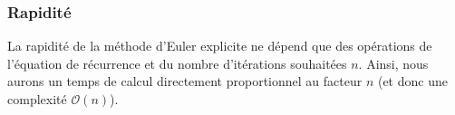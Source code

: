 \documentclass[10pt]{article}
\begin{document}
\subsubsection{Rapidité}
La rapidité de la méthode d’Euler explicite ne dépend que des opérations de l’équation de récurrence et du nombre d’itérations souhaitées $n$. Ainsi, nous aurons un temps de calcul directement proportionnel au facteur $n$ (et donc une complexité $\mathcal{O}(n)$).


\end{document}
